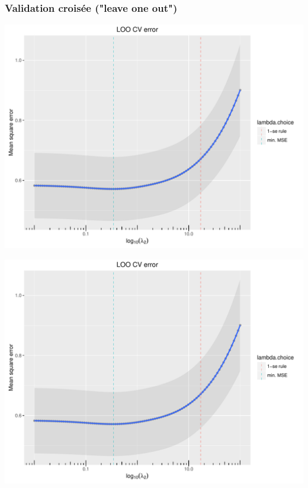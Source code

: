 \documentclass{beamer}\usepackage[]{graphicx}\usepackage[]{color}
\newenvironment{knitrout}{}{} %
\begin{document}
\begin{frame}[containsverbatim]
  \frametitle{Validation croisée ("leave one out")}
\begin{knitrout}\scriptsize
{}\color{fgcolor}
\includegraphics[width=\textwidth]{figures/toy_ridgeunnamed-chunk-56-1} 

\includegraphics[width=\textwidth]{figures/toy_ridgeunnamed-chunk-56-2} 

\end{knitrout}
\end{frame}
\end{document}
